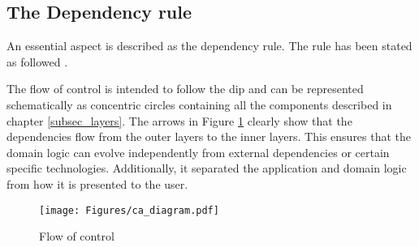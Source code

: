 \subsection{The Dependency rule} \label{sebsec:dependency_rule}

An essential aspect is described as the dependency rule. The rule has been stated as
followed \parencite[206]{robert_c_martin_clean_2018}.


The flow of control is intended to follow the \gls{dip} and can be represented
schematically as concentric circles containing all the components described in chapter
\ref{subsec_layers}. The arrows in Figure \ref{fig_modulair_components} clearly show that
the dependencies flow from the outer layers to the inner layers. This ensures that the
domain logic can evolve independently from external dependencies or certain specific
technologies. Additionally, it separated the application and domain logic from how it is
presented to the user. 

\begin{figure}[H]
    \centering
    \texttt{[image: Figures/ca\_diagram.pdf]}
    \caption[modularity]{Flow of control}
    \label{fig_modulair_components}
\end{figure}